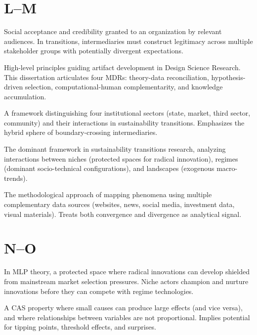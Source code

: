 \documentclass[../main.tex]{subfiles}
\begin{document}
\section*{L--M}

\begin{description}[leftmargin=0.5cm, style=nextline]

\item[Legitimacy] Social acceptance and credibility granted to an organization by relevant audiences. In transitions, intermediaries must construct legitimacy across multiple stakeholder groups with potentially divergent expectations.

\item[Meta-Design Requirement (MDR)] High-level principles guiding artifact development in Design Science Research. This dissertation articulates four MDRs: theory-data reconciliation, hypothesis-driven selection, computational-human complementarity, and knowledge accumulation.

\item[Multi-Actor Perspective (MaP)] A framework distinguishing four institutional sectors (state, market, third sector, community) and their interactions in sustainability transitions. Emphasizes the hybrid sphere of boundary-crossing intermediaries.

\item[Multi-Level Perspective (MLP)] The dominant framework in sustainability transitions research, analyzing interactions between niches (protected spaces for radical innovation), regimes (dominant socio-technical configurations), and landscapes (exogenous macro-trends).

\item[Multimodal Cartography] The methodological approach of mapping phenomena using multiple complementary data sources (websites, news, social media, investment data, visual materials). Treats both convergence and divergence as analytical signal.

\end{description}

\section*{N--O}

\begin{description}[leftmargin=0.5cm, style=nextline]

\item[Niche] In MLP theory, a protected space where radical innovations can develop shielded from mainstream market selection pressures. Niche actors champion and nurture innovations before they can compete with regime technologies.

\item[Non-linearity] A CAS property where small causes can produce large effects (and vice versa), and where relationships between variables are not proportional. Implies potential for tipping points, threshold effects, and surprises.

\end{description}
\end{document}
